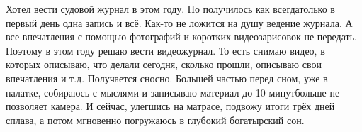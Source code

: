 Хотел вести судовой журнал в этом году. Но получилось как всегда\mdash только в первый день одна запись и всё. Как-то не ложится на душу ведение журнала. А все впечатления с помощью фотографий и коротких видеозарисовок не передать. Поэтому в этом году решаю вести видеожурнал. То есть снимаю видео, в которых описываю, что делали сегодня, сколько прошли, описываю свои впечатления и т.д. Получается сносно. Большей частью перед сном, уже в палатке, собираюсь с мыслями и записываю материал до 10 минут\mdash больше не позволяет камера. И сейчас, улегшись на матрасе, подвожу итоги трёх дней сплава, а потом мгновенно погружаюсь в глубокий богатырский сон.

\begin{center}
\end{center}
